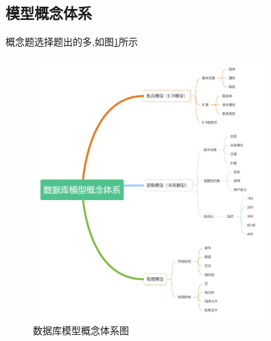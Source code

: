 \documentclass[a4paper,12pt,UTF8,fontset=none]{ctexart}
\begin{document}
\subsection{模型概念体系}
概念题选择题出的多,如图\ref{fig:database-model-system}所示
\FloatBarrier
\begin{figure}[H]
    \centering
    \includegraphics[width=0.8\textwidth]{static/images/数据库模型概念体系.jpg} %
    \caption{数据库模型概念体系图} %
    \label{fig:database-model-system} %
\end{figure}
\end{document}
